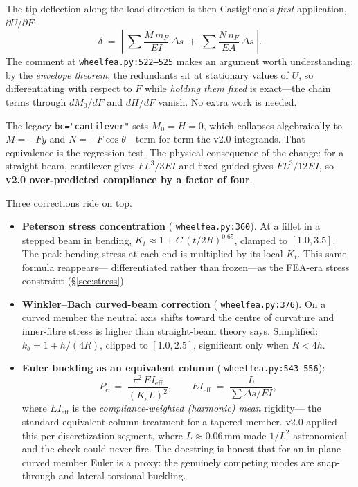 \documentclass[11pt,a4paper]{article}
\DeclareRobustCommand{\code}[1]{%
  \texttt{\small\def\_{\textunderscore\discretionary{}{}{}}#1}}
\newcommand{\at}[2]{\code{#1:#2}}
\begin{document}
The tip deflection along the load direction is then Castigliano's \emph{first}
application, $\partial U/\partial F$:
%
\begin{equation}
  \delta \;=\; \left|\; \sum \frac{M\,m_F}{EI}\,\Delta s
                 \;+\; \sum \frac{N\,n_F}{EA}\,\Delta s \;\right|.
\end{equation}
%
The comment at \at{wheel\_fea.py}{522--525} makes an argument worth understanding: by
the \emph{envelope theorem}, the redundants sit at stationary values of $U$, so
differentiating with respect to $F$ while \emph{holding them fixed} is exact---the
chain terms through $dM_0/dF$ and $dH/dF$ vanish. No extra work is needed.

The legacy \code{bc="cantilever"} sets $M_0 = H = 0$, which collapses algebraically to
$M = -Fy$ and $N = -F\cos\theta$---term for term the v2.0 integrands. That equivalence
is the regression test. The physical consequence of the change: for a straight beam,
cantilever gives $FL^3/3EI$ and fixed-guided gives $FL^3/12EI$, so \textbf{v2.0
over-predicted compliance by a factor of four}.

Three corrections ride on top.

\begin{itemize}
\item \textbf{Peterson stress concentration} (\at{wheel\_fea.py}{360}). At a fillet in a
  stepped beam in bending,
  $K_t \approx 1 + C\,(t/2R)^{0.65}$, clamped to $[1.0, 3.5]$. The peak bending stress
  at each end is multiplied by its local $K_t$. This same formula reappears---%
  differentiated rather than frozen---as the FEA-era stress constraint
  (\S\ref{sec:stress}).

\item \textbf{Winkler--Bach curved-beam correction} (\at{wheel\_fea.py}{376}). On a
  curved member the neutral axis shifts toward the centre of curvature and inner-fibre
  stress is higher than straight-beam theory says. Simplified: $k_b = 1 + h/(4R)$,
  clipped to $[1.0, 2.5]$, significant only when $R < 4h$.

\item \textbf{Euler buckling as an equivalent column} (\at{wheel\_fea.py}{543--556}):
  \begin{equation}
    P_e \;=\; \frac{\pi^2\,EI_{\text{eff}}}{(K_e L)^2},
    \qquad
    EI_{\text{eff}} \;=\; \frac{L}{\sum \Delta s / EI},
  \end{equation}
  where $EI_{\text{eff}}$ is the \emph{compliance-weighted (harmonic) mean} rigidity---%
  the standard equivalent-column treatment for a tapered member. v2.0 applied this per
  discretization segment, where $L \approx 0.06$\,mm made $1/L^2$ astronomical and the
  check could never fire. The docstring is honest that for an in-plane-curved member
  Euler is a proxy: the genuinely competing modes are snap-through and
  lateral-torsional buckling.
\end{itemize}
\end{document}
